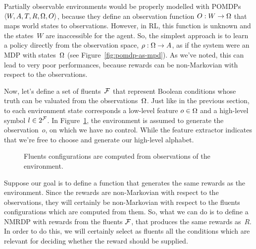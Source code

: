 Partially observable environments would be properly modelled with POMDPs
$\langle W, A, T, R, \Omega, O\rangle$, because they define an observation
function $O: W \to \Omega$ that maps world states to observations. However, in
RL, this function is unknown and the states~$W$ are inaccessible for the
agent. So, the simplest approach is to learn a policy directly from the
observation space, $\rho: \Omega \to A$, as if the system were an MDP with
states~$\Omega$ (see Figure~\vref{fig:pomdp-as-mpd}). As we've noted, this can
lead to very poor performances, because rewards can be non-Markovian with
respect to the observations.

Now, let's define a set of fluents~$\mathcal{F}$ that represent Boolean
conditions whose truth can be valuated from the observations~$\Omega$.
Just like in the previous section, to each environment state corresponds a
low-level feature $o \in \Omega$ and a high-level symbol $l \in 2^{\mathcal{F}}$.
In Figure~\ref{fig:symbols-partial-obs}, the environment is assumed to
generate the observation~$o$, on which we have no control. While the
feature extractor indicates that we're free to choose and generate our
high-level alphabet.
\begin{figure}
	\centering
	\caption{Fluents configurations are computed from observations of the
	environment.}
	\label{fig:symbols-partial-obs}
\end{figure}

Suppose our goal is to define a function that generates the same rewards as
the environment. Since the rewards are non-Markovian with respect to the
observations, they will certainly be non-Markovian with respect to the fluents
configurations which are computed from them. So, what we can do is to define a
NMRDP with \ldl{} rewards from the fluents $\mathcal{F}$, that produces the same
rewards as~$R$. In order to do this, we will certainly select as fluents all
the conditions which are relevant for deciding whether the reward should be
supplied.

